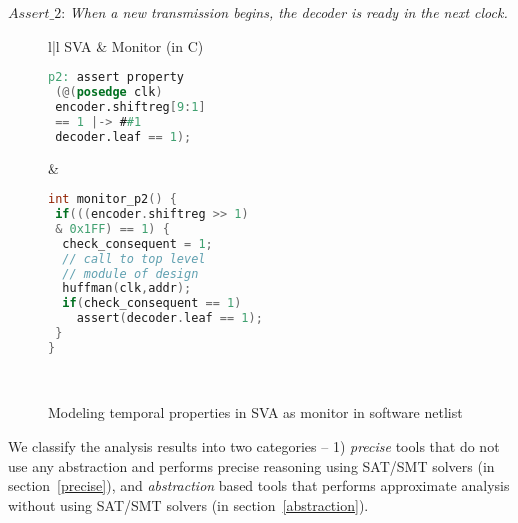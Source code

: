 $Assert\_2$: {\em When a new transmission begins, the decoder is ready in the next clock.} 
\begin{figure}[htbp]
\scriptsize
\begin{tabular}{l|l}
\hline
SVA & Monitor (in C)
\\
\hline
\begin{lstlisting}[mathescape=true,language=Verilog]
p2: assert property 
 (@(posedge clk) 
 encoder.shiftreg[9:1] 
 == 1 |-> ##1 
 decoder.leaf == 1);
\end{lstlisting}
&
\begin{lstlisting}[mathescape=true,language=C]
int monitor_p2() {
 if(((encoder.shiftreg >> 1) 
 & 0x1FF) == 1) {
  check_consequent = 1;
  // call to top level 
  // module of design
  huffman(clk,addr);  
  if(check_consequent == 1) 
    assert(decoder.leaf == 1);
 }
}
\end{lstlisting} \\
\hline
\end{tabular}
\caption{Modeling temporal properties in SVA as monitor in software netlist}
\label{figure:prop2}
\end{figure}
%
We classify the analysis results into two categories -- 1) \emph{precise} tools 
that do not use any abstraction and performs precise reasoning using SAT/SMT solvers 
(in section~\ref{precise}), and \emph{abstraction} based tools that performs 
approximate analysis without using SAT/SMT solvers (in section~\ref{abstraction}). 
%
